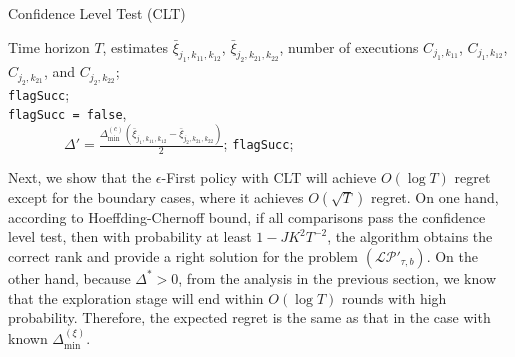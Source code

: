 \begin{algorithm}[htbp]
\caption{Confidence Level Test (CLT)}
\label{alg:clt}
\begin{algorithmic}
 Time horizon $T$, estimates $\bar{\xi}_{j_1,k_{11}, k_{12}}$, $\bar{\xi}_{j_2,k_{21}, k_{22}}$, number of executions $C_{j_1,k_{11}}$, $C_{j_1,k_{12}}$, $C_{j_2,k_{21}}$, and $C_{j_2,k_{22}}$;\\
 \texttt{flagSucc};\\
 \texttt{flagSucc = false}, \\~~~~~~~~$\Delta' = \frac{\Delta^{(c)}_{\min}(\bar{\xi}_{j_1,k_{11}, k_{12}} - \bar{\xi}_{j_2,k_{21}, k_{22}})}{2}$;
\ENDIF
{} \texttt{flagSucc};
\end{algorithmic}
\end{algorithm}

Next, we show that the $\epsilon$-First policy with CLT will achieve $O(\log T)$ regret except for the boundary cases, where it achieves $O(\sqrt{T})$ regret. On one hand, according to Hoeffding-Chernoff bound, if all comparisons pass the confidence level test, then with probability at least $1 - JK^2 T^{-2}$, the algorithm obtains the correct rank and provide a right solution for the problem $({\mathcal{LP}}'_{\tau,b})$. On the other hand, because $\Delta^* > 0$, from the analysis in the previous section, we know that the exploration stage will end within $O(\log T)$ rounds with high probability. Therefore, the expected regret is the same as that in the case with known $\Delta^{(\xi)}_{\min}$. 